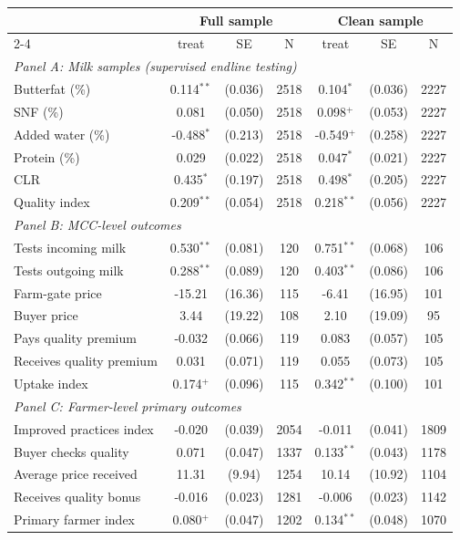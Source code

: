 \begin{tabular}{lcccccc}
\hline\hline
 & \multicolumn{3}{c}{Full sample} & \multicolumn{3}{c}{Clean sample} \\
\cline{2-4} \cline{5-7}
 & treat & SE & N & treat & SE & N \\
\hline
\multicolumn{7}{l}{\textit{Panel A: Milk samples (supervised endline testing)}} \\
Butterfat (\%) & 0.114$^{**}$ & (0.036) & 2518 & 0.104$^{*}$ & (0.036) & 2227 \\
SNF (\%) & 0.081 & (0.050) & 2518 & 0.098$^{+}$ & (0.053) & 2227 \\
Added water (\%) & -0.488$^{*}$ & (0.213) & 2518 & -0.549$^{+}$ & (0.258) & 2227 \\
Protein (\%) & 0.029 & (0.022) & 2518 & 0.047$^{*}$ & (0.021) & 2227 \\
CLR & 0.435$^{*}$ & (0.197) & 2518 & 0.498$^{*}$ & (0.205) & 2227 \\
Quality index & 0.209$^{**}$ & (0.054) & 2518 & 0.218$^{**}$ & (0.056) & 2227 \\
\hline
\multicolumn{7}{l}{\textit{Panel B: MCC-level outcomes}} \\
Tests incoming milk & 0.530$^{**}$ & (0.081) & 120 & 0.751$^{**}$ & (0.068) & 106 \\
Tests outgoing milk & 0.288$^{**}$ & (0.089) & 120 & 0.403$^{**}$ & (0.086) & 106 \\
Farm-gate price & -15.21 & (16.36) & 115 & -6.41 & (16.95) & 101 \\
Buyer price & 3.44 & (19.22) & 108 & 2.10 & (19.09) & 95 \\
Pays quality premium & -0.032 & (0.066) & 119 & 0.083 & (0.057) & 105 \\
Receives quality premium & 0.031 & (0.071) & 119 & 0.055 & (0.073) & 105 \\
Uptake index & 0.174$^{+}$ & (0.096) & 115 & 0.342$^{**}$ & (0.100) & 101 \\
\hline
\multicolumn{7}{l}{\textit{Panel C: Farmer-level primary outcomes}} \\
Improved practices index & -0.020 & (0.039) & 2054 & -0.011 & (0.041) & 1809 \\
Buyer checks quality & 0.071 & (0.047) & 1337 & 0.133$^{**}$ & (0.043) & 1178 \\
Average price received & 11.31 & (9.94) & 1254 & 10.14 & (10.92) & 1104 \\
Receives quality bonus & -0.016 & (0.023) & 1281 & -0.006 & (0.023) & 1142 \\
Primary farmer index & 0.080$^{+}$ & (0.047) & 1202 & 0.134$^{**}$ & (0.048) & 1070 \\
\hline\hline
\end{tabular}
